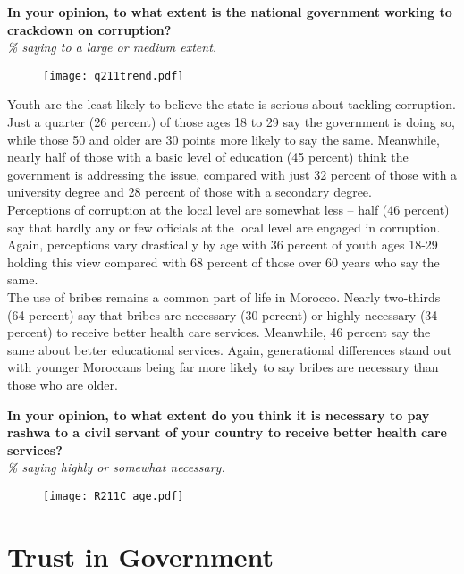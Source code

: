 \documentclass[12pt]{article}
\begin{document}
	\begin{center}
		{\textbf{In your opinion, to what extent is the national government working to crackdown on corruption?}}\\
		\emph{\% saying to a large or medium extent.}
		\begin{figure}[H]
			\centering
			\texttt{[image: q211trend.pdf]}
		\end{figure}
	\end{center}
	
	\noindent Youth are the least likely to believe the state is serious about tackling corruption.  Just a quarter (26 percent) of those ages 18 to 29 say the government is doing so, while those 50 and older are 30 points more likely to say the same. Meanwhile, nearly half of those with a basic level of education (45 percent) think the government is addressing the issue, compared with just 32 percent of those with a university degree and 28 percent of those with a secondary degree.\\
	
	\noindent Perceptions of corruption at the local level are somewhat less -- half (46 percent) say that hardly any or few officials at the local level are engaged in corruption. Again, perceptions vary drastically by age with 36 percent of youth ages 18-29 holding this view compared with 68 percent of those over 60 years who say the same.\\
	
	\noindent The use of bribes remains a common part of life in Morocco. Nearly two-thirds (64 percent) say that bribes are necessary (30 percent) or highly necessary (34 percent) to receive better health care services. Meanwhile, 46 percent say the same about better educational services. Again, generational differences stand out with younger Moroccans being far more likely to say bribes are necessary than those who are older.
	
		\begin{center}
		{\textbf{In your opinion, to what extent do you think it is necessary to pay rashwa to a civil servant of your country to receive better health care services?}}\\
		\emph{\% saying highly or somewhat necessary.}
		\begin{figure}[H]
			\centering
			\texttt{[image: R211C\_age.pdf]}
		\end{figure}
	\end{center}

\section*{Trust in Government}
\end{document}
